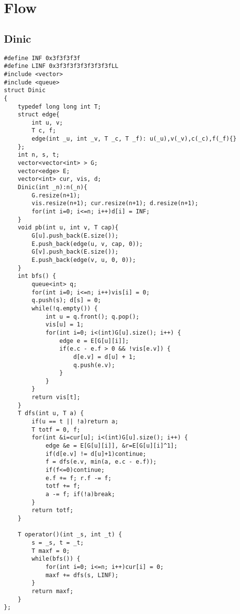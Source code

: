 \section{Flow}
\subsection{Dinic}
\begin{lstlisting}
#define INF 0x3f3f3f3f
#define LINF 0x3f3f3f3f3f3f3f3fLL
#include <vector>
#include <queue>
struct Dinic
{
	typedef long long int T;
	struct edge{
		int u, v;
		T c, f;
		edge(int _u, int _v, T _c, T _f): u(_u),v(_v),c(_c),f(_f){}
	};
	int n, s, t;
	vector<vector<int> > G;
	vector<edge> E;
	vector<int> cur, vis, d;
	Dinic(int _n):n(_n){
		G.resize(n+1);
		vis.resize(n+1); cur.resize(n+1); d.resize(n+1);
		for(int i=0; i<=n; i++)d[i] = INF;
	}
	void pb(int u, int v, T cap){
		G[u].push_back(E.size());
		E.push_back(edge(u, v, cap, 0));
		G[v].push_back(E.size());
		E.push_back(edge(v, u, 0, 0));
	}
	int bfs() {
		queue<int> q;
		for(int i=0; i<=n; i++)vis[i] = 0;
		q.push(s); d[s] = 0;
		while(!q.empty()) {
			int u = q.front(); q.pop();
			vis[u] = 1;
			for(int i=0; i<(int)G[u].size(); i++) {
				edge e = E[G[u][i]];
				if(e.c - e.f > 0 && !vis[e.v]) {
					d[e.v] = d[u] + 1;
					q.push(e.v);
				}
			}
		}
		return vis[t];
	}
	T dfs(int u, T a) {
		if(u == t || !a)return a;
		T totf = 0, f;
		for(int &i=cur[u]; i<(int)G[u].size(); i++) {
			edge &e = E[G[u][i]], &r=E[G[u][i]^1];
			if(d[e.v] != d[u]+1)continue;
			f = dfs(e.v, min(a, e.c - e.f));
			if(f<=0)continue;
			e.f += f; r.f -= f;
			totf += f;
			a -= f; if(!a)break;
		}
		return totf;
	}

	T operator()(int _s, int _t) {
		s = _s, t = _t;
		T maxf = 0;
		while(bfs()) {
			for(int i=0; i<=n; i++)cur[i] = 0;
			maxf += dfs(s, LINF);
		}
		return maxf;
	}
};
\end{lstlisting}
